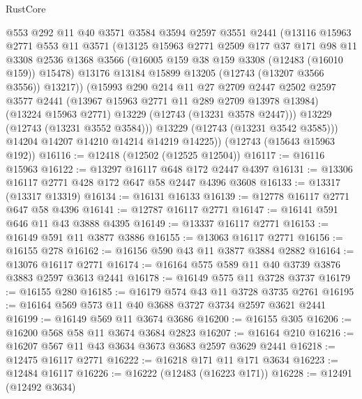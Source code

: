 \begin{lexlean}{RustCore}
\begin{coremodule}
            @553
            @292
            @11
            @40
            @3571
            @3584
            @3594
            @2597
            @3551
            @2441
            (@13116
              @15963
              @2771
              @553
              @11
              @3571
              (@13125
                @15963
                @2771
                @2509
                @177
                @37
                @171
                @98
                @11
                @3308
                @2536
                @1368
                @3566
                (@16005 @159 @38 @159 @3308 (@12483 (@16010 @159)) @15478)
                @13176
                @13184
                @15899
                @13205
                (@12743 (@13207 @3566 @3556))
                @13217))
            (@15993
              @290
              @214
              @11
              @27
              @2709
              @2447
              @2502
              @2597
              @3577
              @2441
              (@13967 @15963 @2771 @11 @289 @2709 @13978 @13984)
              (@13224 @15963 @2771)
              @13229
              (@12743 (@13231 @3578 @2447)))
            @13229
            (@12743 (@13231 @3552 @3584)))
          @13229
          (@12743 (@13231 @3542 @3585)))
        @14204
        @14207
        @14210
        @14214
        @14219
        @14225))
    (@12743 (@15643 @15963 @192))
@16116 := @12418 (@12502 (@12525 @12504))
@16117 := @16116 @15963
@16122 := @13297 @16117 @648 @172 @2447 @4397
@16131 := @13306 @16117 @2771 @428 @172 @647 @58 @2447 @4396 @3608
@16133 := @13317 (@13317 @13319)
@16134 := @16131 @16133
@16139 := @12778 @16117 @2771 @647 @58 @4396
@16141 := @12787 @16117 @2771
@16147 := @16141 @591 @646 @11 @43 @3888 @4395
@16149 := @13337 @16117 @2771
@16153 := @16149 @591 @11 @3877 @3886
@16155 := @13063 @16117 @2771
@16156 := @16155 @278
@16162 := @16156 @590 @43 @11 @3877 @3884 @2882
@16164 := @13076 @16117 @2771
@16174 := @16164 @575 @589 @11 @40 @3739 @3876 @3883 @2597 @3613 @2441
@16178 := @16149 @575 @11 @3728 @3737
@16179 := @16155 @280
@16185 := @16179 @574 @43 @11 @3728 @3735 @2761
@16195 := @16164 @569 @573 @11 @40 @3688 @3727 @3734 @2597 @3621 @2441
@16199 := @16149 @569 @11 @3674 @3686
@16200 := @16155 @305
@16206 := @16200 @568 @58 @11 @3674 @3684 @2823
@16207 := @16164 @210
@16216 := @16207 @567 @11 @43 @3634 @3673 @3683 @2597 @3629 @2441
@16218 := @12475 @16117 @2771
@16222 := @16218 @171 @11 @171 @3634
@16223 := @12484 @16117
@16226 := @16222 (@12483 (@16223 @171))
@16228 := @12491 (@12492 @3634)

\end{coremodule}
\end{lexlean}
